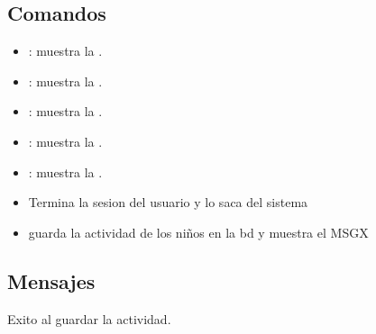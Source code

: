 \subsection{Comandos}
\begin{itemize}
	\item {}: muestra la .
        \item {}: muestra la .
        \item {}: muestra la .
        \item {}: muestra la .
        \item {}: muestra la .
        \item {}Termina la sesion del usuario y lo saca del sistema
        \item {} guarda la actividad de los niños en la bd y muestra el MSGX
\end{itemize}

\subsection{Mensajes}

\begin{Citemize}
	\item Exito al guardar la actividad.
\end{Citemize}

